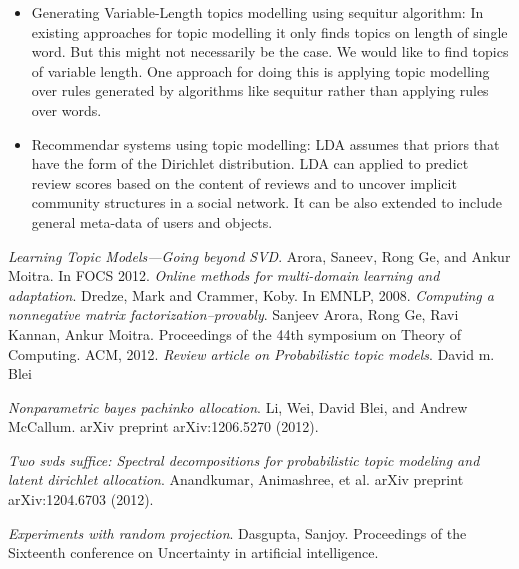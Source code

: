 \documentclass[a4paper,11pt]{article}
\begin{document}
\begin{itemize}

\item Generating Variable-Length topics modelling using sequitur algorithm:
	In existing approaches for topic modelling it only finds topics on length of single word. But this might not necessarily be the case. We would like to find topics of variable length. One approach for doing this is applying topic modelling over rules generated by algorithms like sequitur rather than applying rules over words.

\item Recommendar systems using topic modelling:
	LDA assumes that priors that have the form of the Dirichlet distribution. LDA can applied to predict review scores based on the content of reviews and to uncover implicit community structures in a social network. It can be also extended to include general meta-data of users and objects.

\end{itemize}


\begin{thebibliography}{99}
 \textit{Learning Topic Models---Going beyond SVD}. Arora, Saneev, Rong Ge, and Ankur Moitra. In FOCS 2012.
 \textit{Online methods for multi-domain learning and adaptation}. Dredze, Mark and Crammer, Koby. In
EMNLP, 2008.
 \textit{Computing a nonnegative matrix factorization--provably}. Sanjeev Arora, Rong Ge, Ravi Kannan, Ankur Moitra. Proceedings of the 44th symposium on Theory of Computing. ACM, 2012.  
 \textit{Review article on Probabilistic topic models}. David m. Blei  

 \textit{Nonparametric bayes pachinko allocation}. Li, Wei, David Blei, and Andrew McCallum. arXiv preprint arXiv:1206.5270 (2012). 

 \textit{Two svds suffice: Spectral decompositions for probabilistic topic modeling and latent dirichlet allocation}. Anandkumar, Animashree, et al.  arXiv preprint arXiv:1204.6703 (2012).

 \textit{Experiments with random projection}. Dasgupta, Sanjoy. Proceedings of the Sixteenth conference on Uncertainty in artificial intelligence.


\end{thebibliography}

\pagebreak
\end{document}

